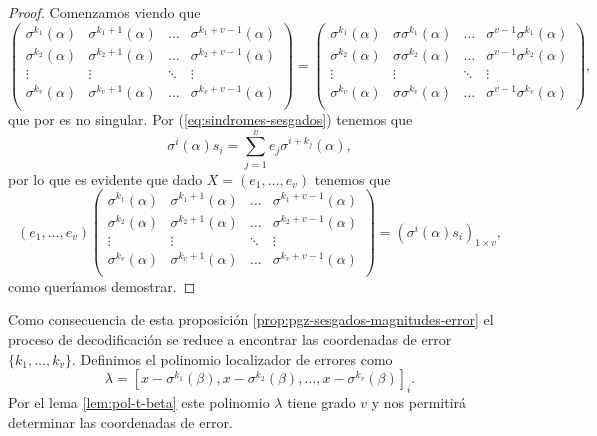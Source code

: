 \begin{proof}
  Comenzamos viendo que
  \[
    \begin{pmatrix}
      \sigma^{k_1}(\alpha) & \sigma^{k_1 + 1}(\alpha) & \dots & \sigma^{k_1 + v - 1}(\alpha)\\ 
      \sigma^{k_2}(\alpha) & \sigma^{k_2 + 1}(\alpha) & \dots & \sigma^{k_2 + v - 1}(\alpha)\\ 
      \vdots & \vdots & \ddots & \vdots\\ 
      \sigma^{k_v}(\alpha) & \sigma^{k_v + 1}(\alpha) & \dots & \sigma^{k_v + v - 1}(\alpha)\\ 
     \end{pmatrix} =  \begin{pmatrix}
      \sigma^{k_1}(\alpha) & \sigma\sigma^{k_1}(\alpha) & \dots & \sigma^{v - 1}\sigma^{k_1}(\alpha)\\ 
      \sigma^{k_2}(\alpha) & \sigma\sigma^{k_2}(\alpha) & \dots & \sigma^{v - 1}\sigma^{k_2}(\alpha)\\ 
      \vdots & \vdots & \ddots & \vdots\\ 
      \sigma^{k_v}(\alpha) & \sigma\sigma^{k_v}(\alpha) & \dots & \sigma^{v - 1}\sigma^{k_v}(\alpha)\\ 
     \end{pmatrix},
  \]
  que por \parencite[Lema 2.1]{gomez-torrecillas_petersongorensteinzierler_2018} es no singular.
  Por (\ref{eq:sindromes-sesgados}) tenemos que 
  \[
    \sigma^{i}(\alpha)s_i = \sum_{j = 1}^{v}e_j\sigma^{i + k_j}(\alpha),
  \]
  por lo que es evidente que dado \(X = (e_1, \dots, e_v)\) tenemos que
  \[
    (e_1, \dots, e_v) \begin{pmatrix}
      \sigma^{k_1}(\alpha) & \sigma^{k_1 + 1}(\alpha) & \dots & \sigma^{k_1 + v - 1}(\alpha)\\ 
      \sigma^{k_2}(\alpha) & \sigma^{k_2 + 1}(\alpha) & \dots & \sigma^{k_2 + v - 1}(\alpha)\\ 
      \vdots & \vdots & \ddots & \vdots\\ 
      \sigma^{k_v}(\alpha) & \sigma^{k_v + 1}(\alpha) & \dots & \sigma^{k_v + v - 1}(\alpha)\\ 
     \end{pmatrix} = \left(\sigma^{i}(\alpha)s_i\right)_{1 \times v},
  \]
  como queríamos demostrar.
\end{proof}

Como consecuencia de esta proposición \ref{prop:pgz-sesgados-magnitudes-error} el proceso de decodificación se reduce a encontrar las coordenadas de error \(\{k_1, \dots, k_v\}\).
Definimos el polinomio localizador de errores como
\[
  \lambda = \left[x - \sigma^{k_1}(\beta), x - \sigma^{k_2}(\beta), \dots, x - \sigma^{k_v}(\beta)\right]_{i}.
\]
Por el lema \ref{lem:pol-t-beta} este polinomio \(\lambda\) tiene grado \(v\) y nos permitirá determinar las coordenadas de error.

